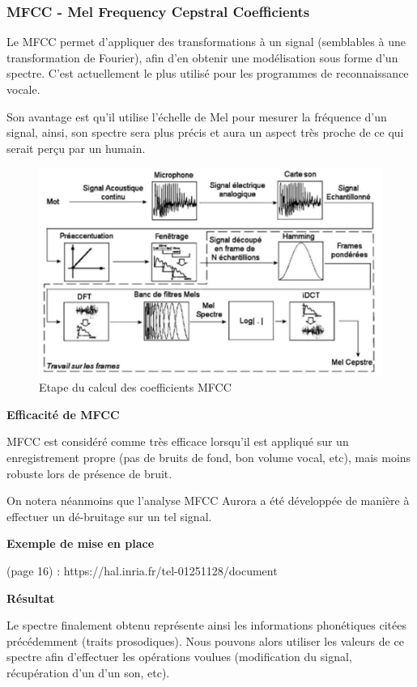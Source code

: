 \documentclass[a4paper, 12pt]{book}
\newcounter{program}[subsection]
\begin{document}
\subsubsection{MFCC - Mel Frequency Cepstral Coefficients}

Le MFCC permet d’appliquer des transformations à un signal (semblables à une transformation de Fourier), afin d’en obtenir une modélisation sous forme d’un spectre. C’est actuellement le plus utilisé pour les programmes de reconnaissance vocale.

Son avantage est qu’il utilise l’échelle de Mel pour mesurer la fréquence d’un signal, ainsi,
son spectre sera plus précis et aura un aspect très proche de ce qui serait perçu par un humain.

\begin{figure}[htbp]
  \centering
  \includegraphics[width=1\linewidth]{fig/mfcc.png}
  \caption{Etape du calcul des coefficients MFCC}
\end{figure}

\textbf{Efficacité de MFCC}

MFCC est considéré comme très efficace lorsqu’il est appliqué sur un enregistrement propre (pas de bruits de fond, bon volume vocal, etc), mais moins robuste lors de présence de bruit.

On notera néanmoins que l’analyse MFCC Aurora a été développée de manière à effectuer un dé-bruitage sur un tel signal.

\textbf{Exemple de mise en place}

(page 16) : https://hal.inria.fr/tel-01251128/document

\textbf{Résultat}

Le spectre finalement obtenu représente ainsi les informations phonétiques citées précédemment (traits prosodiques). Nous pouvons alors utiliser les valeurs de ce spectre afin d’effectuer les opérations voulues (modification du signal, récupération d’un d’un son, etc).
\end{document}
